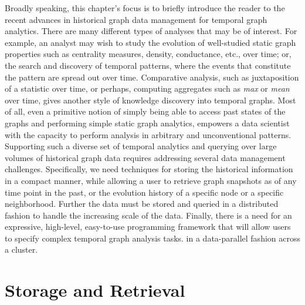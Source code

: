\documentclass{svjour3}
\begin{document}




Broadly speaking, this chapter's focus is to briefly introduce the reader to the recent advances in historical graph data management for temporal graph analytics. 
There are many different types of analyses that may be of interest. 
For example, an analyst may wish to study the evolution of well-studied static graph properties such
as centrality measures, density, conductance, etc., over time; or, the search and 
discovery of temporal patterns, where the events that constitute the pattern are spread out over time. 
Comparative analysis, such as juxtaposition of a statistic over time, or perhaps, computing 
aggregates such as \textit{max} or \textit{mean} over time, gives another style of knowledge discovery 
into temporal graphs. Most of all, even a primitive notion of simply being able to access past states of the graphs 
and performing simple static graph analytics, empowers a data scientist with the capacity to 
perform analysis in arbitrary and unconventional patterns. 
Supporting such a diverse set of temporal analytics and querying over large volumes of historical graph data 
requires addressing several data management challenges. Specifically, we need techniques for storing
the historical information in a compact manner, while allowing a user to retrieve graph snapshots as of any
time point in the past, or the evolution history of a specific node or a specific neighborhood. Further the
data must be stored and queried in a distributed fashion to handle the increasing scale of the data. 
Finally, there is a need for an expressive, high-level, easy-to-use programming framework that will allow users to 
specify complex temporal graph analysis tasks. %
in a data-parallel fashion across a cluster.



\section{Storage and Retrieval}
\end{document}
